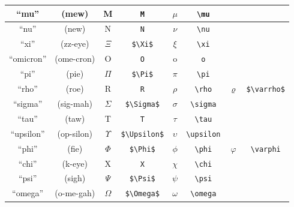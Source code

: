 \documentclass[final,10pt,letterpaper,landscape]{article}
\begin{document}
{\begin{tabular}{c | c || c | c || c | c | c | c}
    \hline
    \hline
    ``mu''      & (mew)       & M             & \texttt{M}           & $\mu$      & \verb#\mu#      & & \\
    \hline
    \hline
    ``nu''      & (new)       & N             & \texttt{N}           & $\nu$      & \verb#\nu#      & & \\
    \hline
    \hline
    ``xi''      & (zz-eye)    & $\Xi$         & \verb#$\Xi$#         & $\xi$      & \verb#\xi#      & & \\
    \hline
    \hline
    ``omicron'' & (ome-cron)  & O             & \texttt{O}           & o          & \texttt{o}      & & \\
    \hline
    \hline
    ``pi''      & (pie)       & $\Pi$         & \verb#$\Pi$#         & $\pi$      & \verb#\pi#      & & \\
    \hline
    \hline
    ``rho''     & (roe)       & R             & \texttt{R}           & $\rho$     & \verb#\rho#     & $\varrho$     & \verb#$\varrho$# \\
    \hline
    \hline
    ``sigma''   & (sig-mah)   & $\Sigma$      & \verb#$\Sigma$#      & $\sigma$   & \verb#\sigma#   & & \\
    \hline
    \hline
    ``tau''     & (taw)       & T             & \texttt{T}           & $\tau$     & \verb#\tau#     & & \\
    \hline
    \hline
    ``upsilon'' & (op-silon)  & $\Upsilon$    & \verb#$\Upsilon$#    & $\upsilon$ & \verb#\upsilon# & & \\
    \hline
    \hline
    ``phi''     & (fie)       & $\Phi$        & \verb#$\Phi$#        & $\phi$     & \verb#\phi#     & $\varphi$     & \verb#\varphi#   \\
    \hline
    \hline
    ``chi''     & (k-eye)     & X             & \texttt{X}           & $\chi$     & \verb#\chi#     & & \\
    \hline
    \hline
    ``psi''     & (sigh)      & $\Psi$        & \verb#$\Psi$#        & $\psi$     & \verb#\psi#     & & \\
    \hline
    \hline
    ``omega''   & (o-me-gah)  & $\Omega$      & \verb#$\Omega$#      & $\omega$   & \verb#\omega#   & &
  \end{tabular}
}
\end{document}

